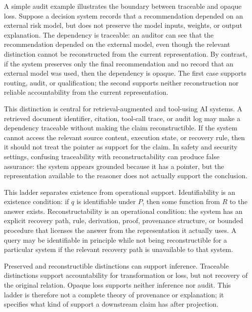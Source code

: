 \documentclass[11pt]{article}
\begin{document}
A simple audit example illustrates the boundary between traceable and opaque loss. Suppose a decision system records that a recommendation depended on an external risk model, but does not preserve the model inputs, weights, or output explanation. The dependency is traceable: an auditor can see that the recommendation depended on the external model, even though the relevant distinction cannot be reconstructed from the current representation. By contrast, if the system preserves only the final recommendation and no record that an external model was used, then the dependency is opaque. The first case supports routing, audit, or qualification; the second supports neither reconstruction nor reliable accountability from the current representation.

This distinction is central for retrieval-augmented and tool-using AI systems. A retrieved document identifier, citation, tool-call trace, or audit log may make a dependency traceable without making the claim reconstructible. If the system cannot access the relevant source content, execution state, or recovery rule, then it should not treat the pointer as support for the claim. In safety and security settings, confusing traceability with reconstructability can produce false assurance: the system appears grounded because it has a pointer, but the representation available to the reasoner does not actually support the conclusion.

This ladder separates existence from operational support. Identifiability is an existence condition: if $q$ is identifiable under $P$, then some function from $R$ to the answer exists. Reconstructability is an operational condition: the system has an explicit recovery path, rule, derivation, proof, provenance structure, or bounded procedure that licenses the answer from the representation it actually uses. A query may be identifiable in principle while not being reconstructible for a particular system if the relevant recovery path is unavailable to that system.

Preserved and reconstructible distinctions can support inference. Traceable distinctions support accountability for transformation or loss, but not recovery of the original relation. Opaque loss supports neither inference nor audit. This ladder is therefore not a complete theory of provenance or explanation; it specifies what kind of support a downstream claim has after projection.
\end{document}
